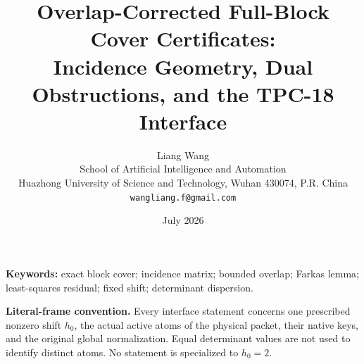 \documentclass[11pt]{article}
\title{\textbf{Overlap-Corrected Full-Block Cover Certificates:}\\
Incidence Geometry, Dual Obstructions, and the TPC-18 Interface}
\author{Liang Wang\\
School of Artificial Intelligence and Automation\\
Huazhong University of Science and Technology, Wuhan 430074, P.R. China\\
\texttt{wangliang.f@gmail.com}}
\date{July 2026}
\theoremstyle{definition}
\theoremstyle{remark}
\begin{document}
\maketitle



\noindent\textbf{Keywords:}
exact block cover; incidence matrix; bounded overlap; Farkas lemma;
least-squares residual; fixed shift; determinant dispersion.

\medskip
\noindent\textbf{Literal-frame convention.}
Every interface statement concerns one prescribed nonzero shift
\(h_0\), the actual active atoms of the physical packet, their native
keys, and the original global normalization.  Equal determinant
values are not used to identify distinct atoms.  No statement is
specialized to \(h_0=2\).










\begingroup
\footnotesize
\raggedright


\endgroup
\end{document}
